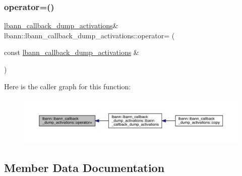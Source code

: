 \mbox{\label{classlbann_1_1lbann__callback__dump__activations_a27665cb0bc6f0f05a3d8b54a588f98ff}} 
\subsubsection{\texorpdfstring{operator=()}{operator=()}}
{\footnotesize\ttfamily \hyperlink{classlbann_1_1lbann__callback__dump__activations}{lbann\+\_\+callback\+\_\+dump\+\_\+activations}\& lbann\+::lbann\+\_\+callback\+\_\+dump\+\_\+activations\+::operator= (\begin{DoxyParamCaption}\item[{const \hyperlink{classlbann_1_1lbann__callback__dump__activations}{lbann\+\_\+callback\+\_\+dump\+\_\+activations} \&}]{ }\end{DoxyParamCaption})\hspace{0.3cm}{\ttfamily [default]}}

Here is the caller graph for this function\+:\nopagebreak
\begin{figure}[H]
\begin{center}
\leavevmode
\includegraphics[width=350pt]{classlbann_1_1lbann__callback__dump__activations_a27665cb0bc6f0f05a3d8b54a588f98ff_icgraph}
\end{center}
\end{figure}


\subsection{Member Data Documentation}
\mbox{\label{classlbann_1_1lbann__callback__dump__activations_a5775d9317de386e07cbd137122db6ee6}} 
